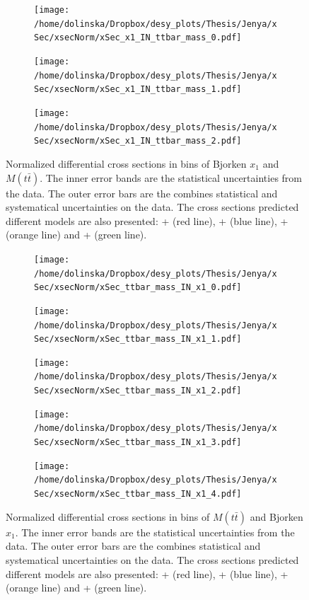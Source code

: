 \begin{figure}[p]
\centering
\begin{subfigure}
  \centering
  \texttt{[image: /home/dolinska/Dropbox/desy\_plots/Thesis/Jenya/xSec/xsecNorm/xSec\_x1\_IN\_ttbar\_mass\_0.pdf]}
\end{subfigure}
\begin{subfigure}
  \centering
  \texttt{[image: /home/dolinska/Dropbox/desy\_plots/Thesis/Jenya/xSec/xsecNorm/xSec\_x1\_IN\_ttbar\_mass\_1.pdf]}
\end{subfigure}
\begin{subfigure}
  \centering
  \texttt{[image: /home/dolinska/Dropbox/desy\_plots/Thesis/Jenya/xSec/xsecNorm/xSec\_x1\_IN\_ttbar\_mass\_2.pdf]}
\end{subfigure}
\caption{Normalized differential cross sections in bins of Bjorken $x_{1}$ and $M(t\bar{t})$. The inner error bands are the statistical uncertainties from the data.
         The outer error bars are the combines statistical and systematical uncertainties on the data. The cross sections predicted different models are also presented:
         \MG + \PYTHIA (red line), \Powheg + \PYTHIA (blue line), \Powheg + \HERWIG (orange line) and \MCNLO + \HERWIG (green line).}
\label{fig:XS_2D_x1_Mtt}
\end{figure}
\begin{figure}
\centering
\begin{subfigure}
  \centering
  \texttt{[image: /home/dolinska/Dropbox/desy\_plots/Thesis/Jenya/xSec/xsecNorm/xSec\_ttbar\_mass\_IN\_x1\_0.pdf]}
\end{subfigure}
\begin{subfigure}
  \centering
  \texttt{[image: /home/dolinska/Dropbox/desy\_plots/Thesis/Jenya/xSec/xsecNorm/xSec\_ttbar\_mass\_IN\_x1\_1.pdf]}
\end{subfigure}
\begin{subfigure}
  \centering
  \texttt{[image: /home/dolinska/Dropbox/desy\_plots/Thesis/Jenya/xSec/xsecNorm/xSec\_ttbar\_mass\_IN\_x1\_2.pdf]}
\end{subfigure}
\begin{subfigure}
  \centering
  \texttt{[image: /home/dolinska/Dropbox/desy\_plots/Thesis/Jenya/xSec/xsecNorm/xSec\_ttbar\_mass\_IN\_x1\_3.pdf]}
\end{subfigure}
\begin{subfigure}
  \centering
  \texttt{[image: /home/dolinska/Dropbox/desy\_plots/Thesis/Jenya/xSec/xsecNorm/xSec\_ttbar\_mass\_IN\_x1\_4.pdf]}
\end{subfigure}
\caption{Normalized differential cross sections in bins of $M(t\bar{t})$ and Bjorken $x_{1}$. The inner error bands are the statistical uncertainties from the data.
         The outer error bars are the combines statistical and systematical uncertainties on the data. The cross sections predicted different models are also presented:
         \MG + \PYTHIA (red line), \Powheg + \PYTHIA (blue line), \Powheg + \HERWIG (orange line) and \MCNLO + \HERWIG (green line).}
\label{fig:XS_2D_x1_Mtt1}
\end{figure}

